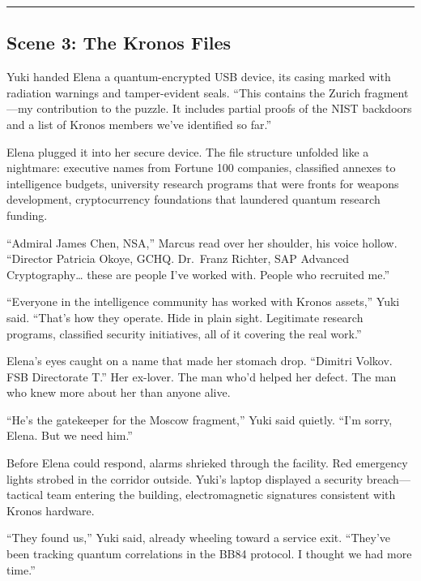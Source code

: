 \begin{center}\rule{0.5\linewidth}{0.5pt}\end{center}

\hypertarget{scene-3-the-kronos-files}{%
\subsection{Scene 3: The Kronos Files}\label{scene-3-the-kronos-files}}

Yuki handed Elena a quantum-encrypted USB device, its casing marked with radiation warnings and tamper-evident seals. ``This contains the Zurich fragment---my contribution to the puzzle. It includes partial proofs of the NIST backdoors and a list of Kronos members we've identified so far.''

Elena plugged it into her secure device. The file structure unfolded like a nightmare: executive names from Fortune 100 companies, classified annexes to intelligence budgets, university research programs that were fronts for weapons development, cryptocurrency foundations that laundered quantum research funding.

``Admiral James Chen, NSA,'' Marcus read over her shoulder, his voice hollow. ``Director Patricia Okoye, GCHQ. Dr.~Franz Richter, SAP Advanced Cryptography\ldots{} these are people I've worked with. People who recruited me.''

``Everyone in the intelligence community has worked with Kronos assets,'' Yuki said. ``That's how they operate. Hide in plain sight. Legitimate research programs, classified security initiatives, all of it covering the real work.''

Elena's eyes caught on a name that made her stomach drop. ``Dimitri Volkov. FSB Directorate T.'' Her ex-lover. The man who'd helped her defect. The man who knew more about her than anyone alive.

``He's the gatekeeper for the Moscow fragment,'' Yuki said quietly. ``I'm sorry, Elena. But we need him.''

Before Elena could respond, alarms shrieked through the facility. Red emergency lights strobed in the corridor outside. Yuki's laptop displayed a security breach---tactical team entering the building, electromagnetic signatures consistent with Kronos hardware.

``They found us,'' Yuki said, already wheeling toward a service exit. ``They've been tracking quantum correlations in the BB84 protocol. I thought we had more time.''

